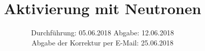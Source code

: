 

\subject{Versuch 702}
\title{Aktivierung mit Neutronen}
\date{
  Durchführung: 05.06.2018
  \hspace{3em}
  Abgabe: 12.06.2018\\
  Abgabe der Korrektur per E-Mail: 25.06.2018
}


    \maketitle
    \thispagestyle{empty}
    \tableofcontents
    \newpage
    
    
    \newpage
    
    \newpage
    
    
    \printbibliography{}
    

